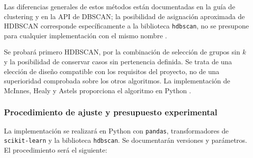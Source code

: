 Las diferencias generales de estos métodos están documentadas en la guía de clustering y en la API de DBSCAN; la posibilidad de asignación aproximada de HDBSCAN corresponde específicamente a la biblioteca \texttt{hdbscan}, no se presupone para cualquier implementación con el mismo nombre \cite{sklearnClusteringPerfiles,sklearnDBSCANPerfiles,hdbscanPrediccionPerfiles}.

Se probará primero HDBSCAN, por la combinación de selección de grupos sin $k$ y la posibilidad de conservar casos sin pertenencia definida. Se trata de una elección de diseño compatible con los requisitos del proyecto, no de una superioridad comprobada sobre los otros algoritmos. La implementación de McInnes, Healy y Astels proporciona el algoritmo en Python \cite{mcinnes2017hdbscan}.

\subsubsection*{Procedimiento de ajuste y presupuesto experimental}
La implementación se realizará en Python con \texttt{pandas}, transformadores de \texttt{scikit-learn} y la biblioteca \texttt{hdbscan}. Se documentarán versiones y parámetros. El procedimiento será el siguiente:
